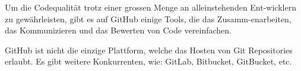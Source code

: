 Um die Codequalität trotz einer grossen Menge an alleinstehenden Ent\hyp{}wicklern zu
gewährleisten, gibt es auf GitHub einige Tools, die das Zusamm\hyp{}enarbeiten, das
Kommunizieren und das Bewerten von Code vereinfachen.

GitHub ist nicht die einzige Plattform, welche das Hosten von Git Repositories
erlaubt. Es gibt weitere Konkurrenten, wie: GitLab, Bitbucket, GitBucket, etc.
\cite{noauthor_top_2021}
